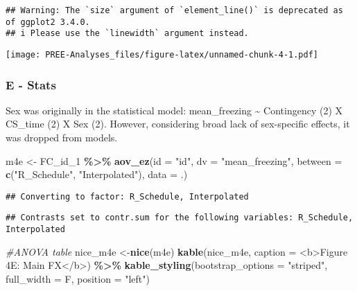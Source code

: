 \documentclass[
]{article}
\newenvironment{Shaded}{\begin{snugshade}}{\end{snugshade}}
\newcommand{\AttributeTok}[1]{\textcolor[rgb]{0.13,0.29,0.53}{#1}}
\newcommand{\CommentTok}[1]{\textcolor[rgb]{0.56,0.35,0.01}{\textit{#1}}}
\newcommand{\FunctionTok}[1]{\textcolor[rgb]{0.13,0.29,0.53}{\textbf{#1}}}
\newcommand{\NormalTok}[1]{#1}
\newcommand{\OtherTok}[1]{\textcolor[rgb]{0.56,0.35,0.01}{#1}}
\newcommand{\SpecialCharTok}[1]{\textcolor[rgb]{0.81,0.36,0.00}{\textbf{#1}}}
\newcommand{\StringTok}[1]{\textcolor[rgb]{0.31,0.60,0.02}{#1}}
\begin{document}
\begin{verbatim}
## Warning: The `size` argument of `element_line()` is deprecated as of ggplot2 3.4.0.
## i Please use the `linewidth` argument instead.
\end{verbatim}

\texttt{[image: PREE-Analyses\_files/figure-latex/unnamed-chunk-4-1.pdf]}

\hypertarget{e---stats}{%
\subsubsection{E - Stats}\label{e---stats}}

Sex was originally in the statistical model: mean\_freezing
\textasciitilde{} Contingency (2) X CS\_time (2) X Sex (2). However,
considering broad lack of sex-specific effects, it was dropped from
models.

\begin{Shaded}
\begin{Highlighting}[]
\NormalTok{m4e }\OtherTok{\textless{}{-}}\NormalTok{ FC\_id\_1 }\SpecialCharTok{\%\textgreater{}\%}
  \FunctionTok{aov\_ez}\NormalTok{(}\AttributeTok{id =} \StringTok{"id"}\NormalTok{,}
         \AttributeTok{dv =} \StringTok{"mean\_freezing"}\NormalTok{,}
         \AttributeTok{between =} \FunctionTok{c}\NormalTok{(}\StringTok{"R\_Schedule"}\NormalTok{, }\StringTok{"Interpolated"}\NormalTok{),}
         \AttributeTok{data =}\NormalTok{ .)}
\end{Highlighting}
\end{Shaded}

\begin{verbatim}
## Converting to factor: R_Schedule, Interpolated
\end{verbatim}

\begin{verbatim}
## Contrasts set to contr.sum for the following variables: R_Schedule, Interpolated
\end{verbatim}

\begin{Shaded}
\begin{Highlighting}[]
\CommentTok{\#ANOVA table}
\NormalTok{nice\_m4e }\OtherTok{\textless{}{-}}\FunctionTok{nice}\NormalTok{(m4e)}
\FunctionTok{kable}\NormalTok{(nice\_m4e, }\AttributeTok{caption =} \StringTok{\textquotesingle{}\textless{}b\textgreater{}Figure 4E: Main FX\textless{}/b\textgreater{}\textquotesingle{}}\NormalTok{) }\SpecialCharTok{\%\textgreater{}\%} 
  \FunctionTok{kable\_styling}\NormalTok{(}\AttributeTok{bootstrap\_options =} \StringTok{"striped"}\NormalTok{, }\AttributeTok{full\_width =}\NormalTok{ F, }\AttributeTok{position =} \StringTok{"left"}\NormalTok{)}
\end{Highlighting}
\end{Shaded}
\end{document}
